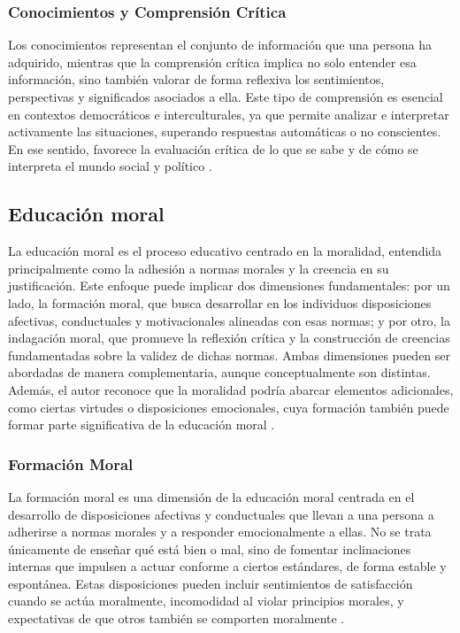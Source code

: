 \subsubsection{Conocimientos y Comprensión Crítica}
Los conocimientos representan el conjunto de información que una persona ha
adquirido, mientras que la comprensión crítica implica no solo entender esa
información, sino también valorar de forma reflexiva los sentimientos,
perspectivas y significados asociados a ella. Este tipo de comprensión es
esencial en contextos democráticos e interculturales, ya que permite analizar e
interpretar activamente las situaciones, superando respuestas automáticas o no
conscientes. En ese sentido, favorece la evaluación crítica de lo que se sabe y
de cómo se interpreta el mundo social y político \cite{barrett2016competences}.

\subsection{Educación moral}
La educación moral es el proceso educativo centrado en la moralidad, entendida
principalmente como la adhesión a normas morales y la creencia en su
justificación. Este enfoque puede implicar dos dimensiones fundamentales: por
un lado, la formación moral, que busca desarrollar en los individuos
disposiciones afectivas, conductuales y motivacionales alineadas con esas
normas; y por otro, la indagación moral, que promueve la reflexión crítica y la
construcción de creencias fundamentadas sobre la validez de dichas normas.
Ambas dimensiones pueden ser abordadas de manera complementaria, aunque
conceptualmente son distintas. Además, el autor reconoce que la moralidad
podría abarcar elementos adicionales, como ciertas virtudes o disposiciones
emocionales, cuya formación también puede formar parte significativa de la
educación moral \cite{hand2017moral}.

\subsubsection{Formación Moral}
La formación moral es una dimensión de la educación moral centrada en el
desarrollo de disposiciones afectivas y conductuales que llevan a una persona a
adherirse a normas morales y a responder emocionalmente a ellas. No se trata
únicamente de enseñar qué está bien o mal, sino de fomentar inclinaciones
internas que impulsen a actuar conforme a ciertos estándares, de forma estable
y espontánea. Estas disposiciones pueden incluir sentimientos de satisfacción
cuando se actúa moralmente, incomodidad al violar principios morales, y
expectativas de que otros también se comporten moralmente \cite{hand2017moral}.

